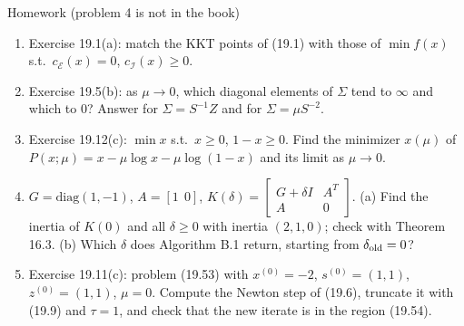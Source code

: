 \documentclass[aspectratio=169,12pt]{beamer}
\newcommand{\cE}{\mathcal{E}}
\newcommand{\cI}{\mathcal{I}}
\begin{document}
\begin{frame}{Homework {\normalfont\small(problem 4 is not in the book)}}
  \begin{enumerate}\setlength\itemsep{0.25em}
    \item Exercise 19.1(a): match the KKT points of (19.1) with those of
      $\min f(x)$ s.t.\ $c_{\cE}(x)=0$, $c_{\cI}(x)\ge 0$.
    \item Exercise 19.5(b): as $\mu\to 0$, which diagonal elements of $\Sigma$ tend to $\infty$ and which to $0$?
      Answer for $\Sigma=S^{-1}Z$ and for $\Sigma=\mu S^{-2}$.
    \item Exercise 19.12(c): $\min x$ s.t.\ $x\ge 0$, $1-x\ge 0$. Find the minimizer $x(\mu)$ of
      $P(x;\mu)=x-\mu\log x-\mu\log(1-x)$ and its limit as $\mu\to 0$.
    \item $G=\mathrm{diag}(1,-1)$, $A=[1\ \ 0]$, $K(\delta)=\begin{bmatrix} G+\delta I & A^{T}\\ A & 0\end{bmatrix}$.
      (a) Find the inertia of $K(0)$ and all $\delta\ge 0$ with inertia $(2,1,0)$; check with Theorem 16.3.
      (b) Which $\delta$ does Algorithm B.1 return, starting from $\delta_{\rm old}=0$?
    \item Exercise 19.11(c): problem (19.53) with $x^{(0)}=-2$, $s^{(0)}=(1,1)$, $z^{(0)}=(1,1)$, $\mu=0$.
      Compute the Newton step of (19.6), truncate it with (19.9) and $\tau=1$, and check that the new
      iterate is in the region (19.54).
  \end{enumerate}
\end{frame}
\end{document}
